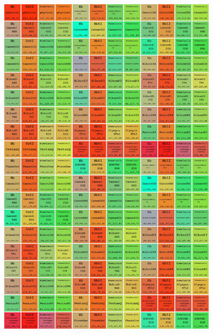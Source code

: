 



\begin{figure}[h!]
  \centering
    \includegraphics[width=0.99\textwidth]{Chapter1/Figs/CameraComparison.jpg}
    \caption{ }  \label{fig:CameraComparison}
\end{figure}

